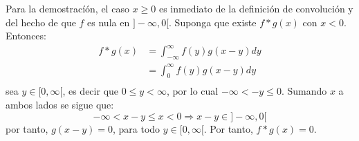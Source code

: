 \documentclass[12pt]{report}
\newcounter{it}
\theoremstyle{largebreak}
\begin{document}
    \begin{sol}
        Para la demostracíón, el caso $x\geq0$ es inmediato de la definición de convolución y del hecho de que $f$ es nula en $]-\infty,0[$. Suponga que existe $f*g(x)$ con $x<0$. Entonces:
        \begin{equation*}
            \begin{split}
                f*g(x)&=\int_{-\infty}^\infty f(y)g(x-y)dy\\
                &=\int_{0}^\infty f(y)g(x-y)dy\\
            \end{split}
        \end{equation*}
        sea $y\in[0,\infty[$, es decir que $0\leq y<\infty$, por lo cual $-\infty<-y\leq0$. Sumando $x$ a ambos lados se sigue que:
        \begin{equation*}
            -\infty<x-y\leq x<0\Rightarrow x-y\in ]-\infty,0[
        \end{equation*}
        por tanto, $g(x-y)=0$, para todo $y\in[0,\infty[$. Por tanto, $f*g(x)=0$.


\end{sol}
\end{document}
